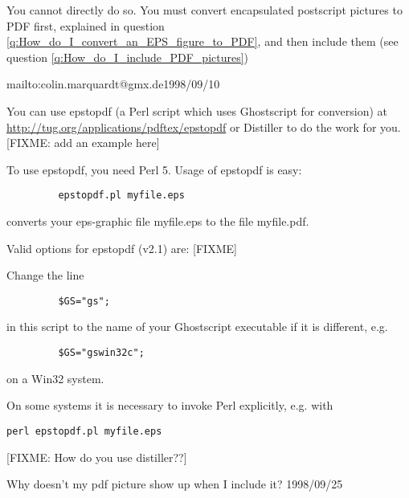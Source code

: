 \documentclass[11pt]{article}
\begin{document}

{ 
  You cannot directly do so.  You must convert encapsulated postscript
  pictures to PDF first, explained in question
  \ref{q:How_do_I_convert_an_EPS_figure_to_PDF}, and then include them
  (see question \ref{q:How_do_I_include_PDF_pictures})}


{  {mailto:colin.marquardt@gmx.de}{1998/09/10}

  You can use epstopdf (a Perl script which uses Ghostscript for
  conversion) at \url{http://tug.org/applications/pdftex/epstopdf} or
  Distiller to do the work for you. [FIXME: add an example here]

  To use epstopdf, you need Perl 5. Usage of epstopdf is easy:
\begin{verbatim}
         epstopdf.pl myfile.eps
\end{verbatim}
  converts your eps-graphic file myfile.eps to the file myfile.pdf.

  Valid options for epstopdf (v2.1) are: [FIXME]

  Change the line
\begin{verbatim}
         $GS="gs";
\end{verbatim}


  in this script to the name of your Ghostscript executable if it is
  different, e.g.
\begin{verbatim}
         $GS="gswin32c";
\end{verbatim}
  on a Win32 system.

  On some systems it is necessary to invoke Perl explicitly, e.g.
  with
\begin{verbatim}
perl epstopdf.pl myfile.eps
\end{verbatim}

[FIXME: How do you use distiller??]
  }


  { Why doesn't my pdf picture show up when I include it?  }{1998/09/25}
\end{document}
